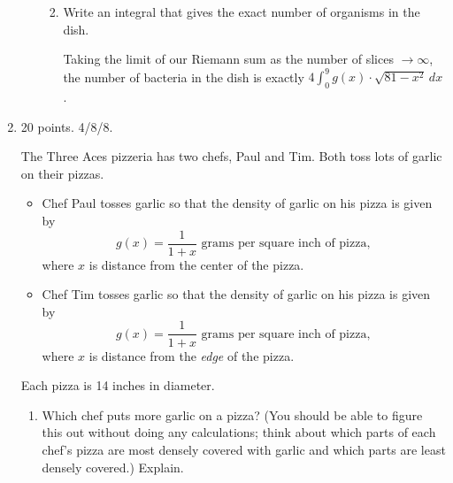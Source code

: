 \documentclass{article}
\begin{document}
\begin{enumerate}
\begin{enumerate}
\begin{enumerate}

    \item
      \begin{problem}[\nstretch{2}]
        Write an integral that gives the exact number of organisms in the
        dish.
      \end{problem}

      \begin{solution}
        Taking the limit of our Riemann sum as the number of slices $\to
        \infty$, the number of bacteria in the dish is exactly
        $$. 
      \end{solution}
    \end{enumerate}

  \end{enumerate}

\item
\begin{grading}
    20 points. 4/8/8.
\end{grading}

  The Three Aces pizzeria has two chefs, Paul and Tim.  Both toss lots of
  garlic on their pizzas.
  \begin{itemize}
  \item Chef Paul tosses garlic so that the density of garlic on his pizza
    is given by
    \[ g(x) = \frac{1}{1 + x} \text{ grams per square inch of pizza},\]
    where $x$ is distance from the center of the pizza.
  \item Chef Tim tosses garlic so that the density of garlic on his pizza
    is given by
    \[ g(x) = \frac{1}{1 + x} \text{ grams per square inch of pizza},\]
    where $x$ is distance from the \emph{edge} of the pizza.
  \end{itemize}
  Each pizza is 14 inches in diameter.

  \begin{enumerate}
  \item
    \begin{problem}[\vfill]
      Which chef puts more garlic on a pizza?  (You should be able to
      figure this out without doing any calculations; think about which
      parts of each chef's pizza are most densely covered with garlic and
      which parts are least densely covered.)  Explain.
    \end{problem}


\end{enumerate}
\end{enumerate}
\end{document}
